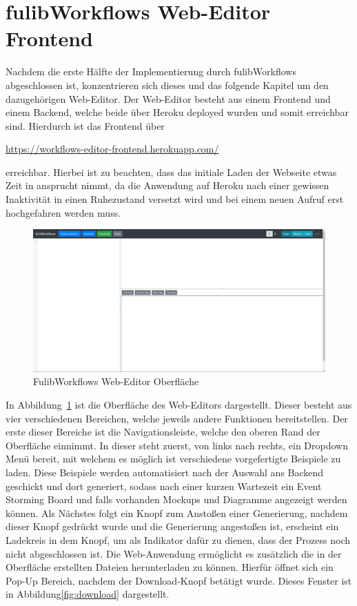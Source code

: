 \section{fulibWorkflows Web-Editor Frontend}\label{sec:editor-frontend}
Nachdem die erste Hälfte der Implementierung durch fulibWorkflows abgeschlossen ist, konzentrieren sich dieses und das folgende Kapitel um den dazugehörigen Web-Editor.
Der Web-Editor besteht aus einem Frontend und einem Backend, welche beide über Heroku deployed wurden und somit erreichbar sind.
Hierdurch ist das Frontend über

\-\hspace{3cm}\url{https://workflows-editor-frontend.herokuapp.com/}

erreichbar.
Hierbei ist zu beachten, dass das initiale Laden der Webseite etwas Zeit in ansprucht nimmt, da die Anwendung auf Heroku nach einer gewissen
Inaktivität in einen Ruhezustand versetzt wird und bei einem neuen Aufruf erst hochgefahren werden muss.

\begin{figure}[h]
    \centering
    \includegraphics[width=1.0\textwidth]{images/3.2/workflows-complete}
    \caption{FulibWorkflows Web-Editor Oberfläche}
    \label{fig:frontend}
\end{figure}

In Abbildung~\ref{fig:frontend} ist die Oberfläche des Web-Editors dargestellt.
Dieser besteht aus vier verschiedenen Bereichen, welche jeweils andere Funktionen bereitstellen.
Der erste dieser Bereiche ist die Navigationsleiste, welche den oberen Rand der Oberfläche einnimmt.
In dieser steht zuerst, von links nach rechts, ein Dropdown Menü bereit, mit welchem es möglich ist verschiedene vorgefertigte Beispiele zu laden.
Diese Beispiele werden automatisiert nach der Auswahl ans Backend geschickt und dort generiert, sodass nach einer kurzen Wartezeit ein Event Storming Board und falls
vorhanden Mockups und Diagramme angezeigt werden können.
Als Nächstes folgt ein Knopf zum Anstoßen einer Generierung, nachdem dieser Knopf gedrückt wurde und die Generierung angestoßen ist, erscheint ein Ladekreis in dem Knopf,
um als Indikator dafür zu dienen, dass der Prozess noch nicht abgeschlossen ist.
Die Web-Anwendung ermöglicht es zusätzlich die in der Oberfläche erstellten Dateien herunterladen zu können.
Hierfür öffnet sich ein Pop-Up Bereich, nachdem der Download-Knopf betätigt wurde.
Dieses Fenster ist in Abbildung\ref{fig:download} dargestellt.


